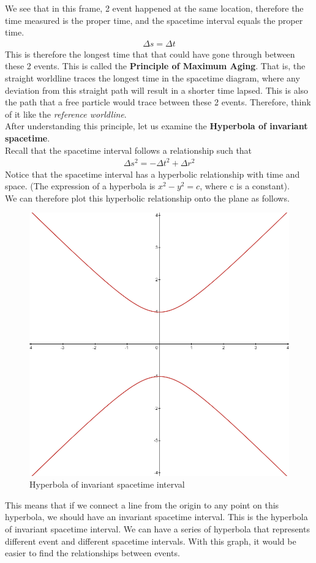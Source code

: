 \documentclass[12pt]{book}
\begin{document}
We see that in this frame, 2 event happened at the same location, therefore the time measured is the proper time, and the spacetime interval equals the proper time.
\begin{align}
\Delta s = \Delta t
\end{align}
This is therefore the longest time that that could have gone through between these 2 events. This is called the \textbf{Principle of Maximum Aging}. That is, the straight worldline traces the longest time in the spacetime diagram, where any deviation from this straight path will result in a shorter time lapsed. This is also the path that a free particle would trace between these 2 events. Therefore, think of it like the \textit{reference worldline}.\\
\newline
After understanding this principle, let us examine the \textbf{Hyperbola of invariant spacetime}.\\
\newline
Recall that the spacetime interval follows a relationship such that
\begin{align}
\Delta s^2 = - \Delta t^2 + \Delta r^2
\end{align}
Notice that the spacetime interval has a hyperbolic relationship with time and space. (The expression of a hyperbola is \( x^2 - y^2 = c\), where c is a constant).
\\
\newpage
We can therefore plot this hyperbolic relationship onto the plane as follows. 
\begin{figure}[!h]
    \centering
    \includegraphics[width=0.5\linewidth]{picture/hyperbola=1.png}
    \caption{Hyperbola of invariant spacetime interval}
    \label{fig:hyperbolic spacetime}
\end{figure}
This means that if we connect a line from the origin to any point on this hyperbola, we should have an invariant spacetime interval. This is the hyperbola of invariant spacetime interval. We can have a series of hyperbola that represents different event and different spacetime intervals. With this graph, it would be easier to find the relationships between events. 
\end{document}
